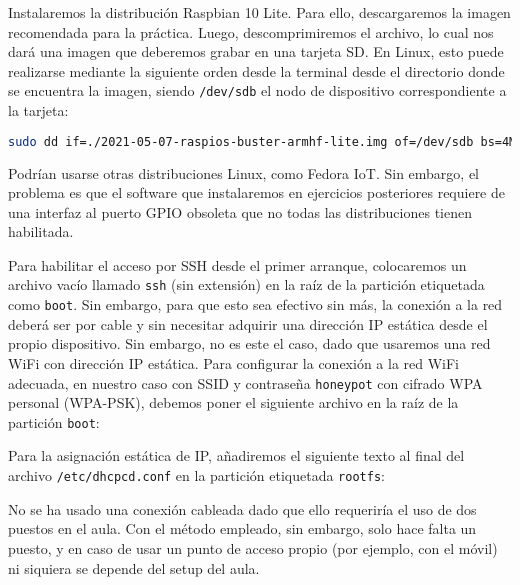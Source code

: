 Instalaremos la distribución Raspbian 10 Lite. Para ello, descargaremos la
imagen recomendada para la práctica\footnotemark. Luego, descomprimiremos el
archivo, lo cual nos dará una imagen que deberemos grabar en una tarjeta SD. En
Linux, esto puede realizarse mediante la siguiente orden desde la terminal
desde el directorio donde se encuentra la imagen, siendo \verb|/dev/sdb| el
nodo de dispositivo correspondiente a la tarjeta:


\begin{lstlisting}[language=sh]
sudo dd if=./2021-05-07-raspios-buster-armhf-lite.img of=/dev/sdb bs=4M status=progress
\end{lstlisting}

Podrían usarse otras distribuciones Linux, como Fedora IoT. Sin embargo, el
problema es que el software que instalaremos en ejercicios posteriores
requiere de una interfaz al puerto GPIO obsoleta que no todas las
distribuciones tienen habilitada\footnotemark.


Para habilitar el acceso por SSH desde el primer arranque, colocaremos un
archivo vacío llamado \verb|ssh| (sin extensión) en la raíz de la partición
etiquetada como \verb|boot|. Sin embargo, para que esto sea efectivo sin más,
la conexión a la red deberá ser por cable y sin necesitar adquirir una
dirección IP estática desde el propio dispositivo. Sin embargo, no es este el
caso, dado que usaremos una red WiFi con dirección IP estática. Para configurar
la conexión a la red WiFi adecuada, en nuestro caso con SSID y contraseña
\verb|honeypot| con cifrado WPA personal (WPA-PSK), debemos poner el siguiente
archivo en la raíz de la partición \verb|boot|:



Para la asignación estática de IP, añadiremos el siguiente texto al final del
archivo \verb|/etc/dhcpcd.conf| en la partición etiquetada \verb|rootfs|:



No se ha usado una conexión cableada dado que ello requeriría el uso de dos
puestos en el aula. Con el método empleado, sin embargo, solo hace falta un
puesto, y en caso de usar un punto de acceso propio (por ejemplo, con el móvil)
ni siquiera se depende del setup del aula.

